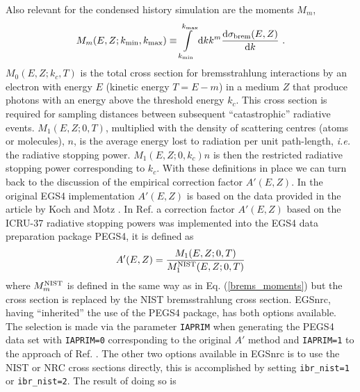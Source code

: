 Also relevant for the condensed history simulation are the 
moments $M_m$,
\begin{equation}
\label{brems_moments}
M_m(E,Z; k_{\rm min},k_{\rm max}) \equiv 
\int\limits_{k_{\rm min}}^{k_{\rm max}} {\rm d}k k^m 
{{\rm d} \sigma_{\rm brem}(E,Z) \over {\rm d} k}~. 
\end{equation}
$M_0(E,Z;k_c,T)$ is the total cross section for bremsstrahlung 
interactions by an electron with energy $E$ (kinetic energy 
$T=E-m$) in a medium $Z$ 
that produce photons with an energy above the 
threshold energy $k_c$. This cross section is required for 
sampling distances between subsequent ``catastrophic'' radiative 
events. $M_1(E,Z;0,T)$, multiplied with the density of scattering 
centres (atoms or molecules), $n$, 
is the average energy lost to radiation per unit path-length, 
{\em i.e.} the radiative stopping power. $M_1(E,Z;0,k_c) n$ is then  
the restricted radiative stopping power corresponding to $k_c$. 
With these definitions in place we can turn back to the 
discussion of the empirical correction factor $A'(E,Z)$. 
In the original EGS4 implementation $A'(E,Z)$ is based on the 
data provided in the article by Koch and Motz \cite{KM59}. 
In Ref. \cite{Ro89a} a correction factor $A'(E,Z)$ based 
on the ICRU-37 radiative stopping powers was implemented 
into the EGS4 data preparation package PEGS4, it is defined as 
\begin{equation}
\label{brems_aprime}
A'(E,Z) = {M_1(E,Z;0,T) \over M_1^{\rm NIST}(E,Z;0,T)}
\end{equation}
where $M_m^{\rm NIST}$ is defined in the same way as 
in Eq. (\ref{brems_moments}) but the cross section is replaced 
by the NIST bremsstrahlung cross section. 
EGSnrc, having ``inherited'' the use of the PEGS4 package, 
has both options available. The selection is made via 
the parameter {\tt IAPRIM} when generating the PEGS4 data 
set with {\tt IAPRIM=0} corresponding to the original 
$A'$ method and {\tt IAPRIM=1} to the approach of Ref. \cite{Ro89a}.  
The other two options available in EGSnrc is to use the NIST or NRC cross sections 
directly, this is accomplished by setting {\tt ibr\_nist=1} or {\tt ibr\_nist=2}. 
The result of doing so is
